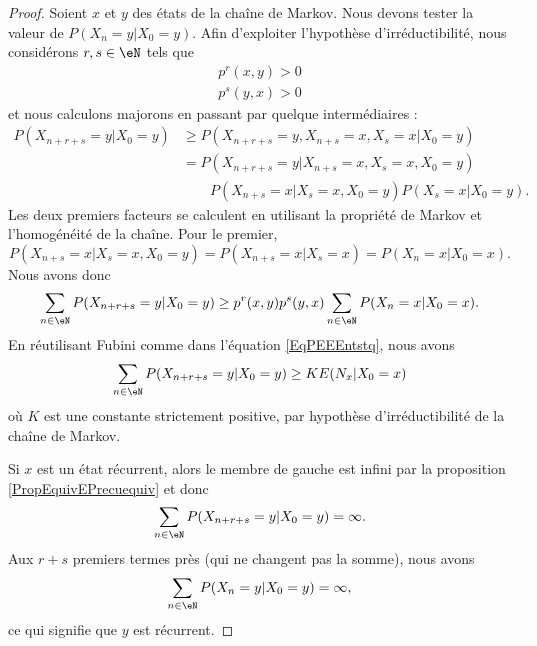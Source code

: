 \begin{proof}
    Soient \( x\) et \( y\) des états de la chaîne de Markov. Nous devons tester la valeur de \( P(X_n=y|X_0=y)\). Afin d'exploiter l'hypothèse d'irréductibilité, nous considérons \( r,s\in\eN\) tels que
    \begin{subequations}
        \begin{align}
            p^r(x,y)>0\\
            p^s(y,x)>0
        \end{align}
    \end{subequations}
    et nous calculons majorons en passant par quelque intermédiaires :
    \begin{subequations}
        \begin{align}
            P(X_{n+r+s}=y|X_0=y)&\geq P(X_{n+r+s}=y,X_{n+s}=x,X_s=x|X_0=y)\\
            &=P(X_{n+r+s}=y|X_{n+s}=x,X_s=x,X_0=y)\\
            &\qquad P(X_{n+s}=x|X_s=x,X_0=y)P(X_s=x|X_0=y)\nonumber.
        \end{align}
    \end{subequations}
    Les deux premiers facteurs se calculent en utilisant la propriété de Markov et l'homogénéité de la chaîne. Pour le premier,
    \begin{equation}
        P(X_{n+s}=x|X_s=x,X_0=y)=P(X_{n+s}=x|X_s=x)=P(X_n=x|X_0=x).
    \end{equation}
    Nous avons donc
    \begin{equation}        \label{EqRmuXtG}
        \sum_{n\in\eN}P(X_{n+r+s}=y|X_0=y)\geq p^r(x,y)p^s(y,x)\sum_{n\in\eN}P(X_n=x|X_0=x).
    \end{equation}
    En réutilisant Fubini comme dans l'équation \eqref{EqPEEEntstq}, nous avons
    \begin{equation}
        \sum_{n\in \eN}P(X_{n+r+s}=y|X_0=y)\geq KE(N_x|X_0=x)
    \end{equation}
    où \( K\) est une constante strictement positive, par hypothèse d'irréductibilité de la chaîne de Markov.

    Si \( x\) est un état récurrent, alors le membre de gauche est infini par la proposition \eqref{PropEquivEPrecuequiv} et donc
    \begin{equation}
        \sum_{n\in\eN}P(X_{n+r+s}=y|X_0=y)=\infty.
    \end{equation}
    Aux \( r+s\) premiers termes près (qui ne changent pas la somme), nous avons 
    \begin{equation}
        \sum_{n\in\eN}P(X_n=y|X_0=y)=\infty,
    \end{equation}
    ce qui signifie que \( y\) est récurrent.
\end{proof}

